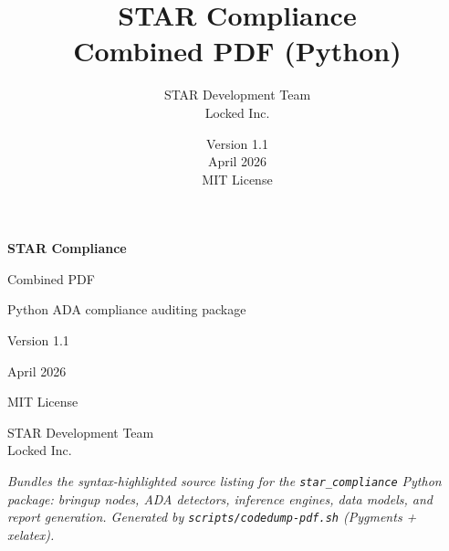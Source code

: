 \documentclass[11pt,letterpaper]{article}
\title{\Huge\bfseries STAR Compliance\\[0.4em]\Large Combined PDF (Python)}
\author{STAR Development Team \\ Locked Inc.}
\date{Version 1.1 \\ April 2026 \\ MIT License}
\begin{document}
\begin{titlepage}
\centering
\vspace*{2.5cm}

{\Huge\bfseries STAR Compliance\par}
\vspace{0.3cm}
{\LARGE Combined PDF\par}
\vspace{0.3cm}
{\large Python ADA compliance auditing package\par}

\vfill

{\large Version 1.1\par}
{\large April 2026\par}
\vspace{0.4cm}
{\large MIT License\par}

\vfill

{\normalsize STAR Development Team\\Locked Inc.\par}
\vspace{0.8cm}

{\small\itshape Bundles the syntax-highlighted source listing for the
\texttt{star\_compliance} Python package: bringup nodes, ADA detectors,
inference engines, data models, and report generation. Generated by
\texttt{scripts/codedump-pdf.sh} (Pygments + xelatex).\par}
\end{titlepage}

\tableofcontents
\newpage


\end{document}
